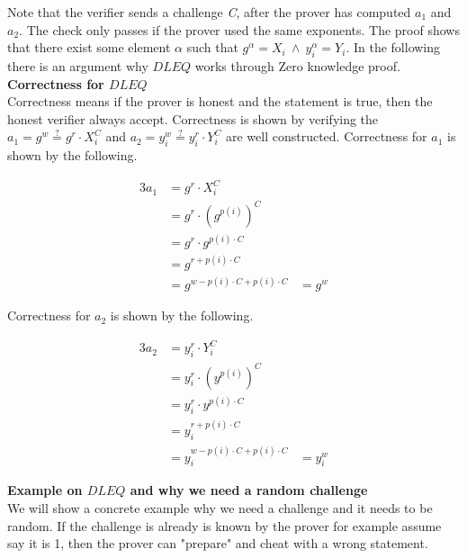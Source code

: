 \noindent
Note that the verifier sends a challenge \textit{C}, after the prover has computed \begin{math}a_1\end{math} and  \begin{math}a_2\end{math}. The check only passes if the prover used the same exponents. The proof shows that there exist some element \begin{math} \alpha\end{math} such that \begin{math}g^\alpha = X_i \ \land \ y_i^\alpha=Y_i \end{math}. In the following there is an argument why $DLEQ$ works through Zero knowledge proof.\\ 



\noindent
\textbf{Correctness for $DLEQ$}\\
Correctness means if the prover is honest and the statement is true, then the honest verifier always accept. Correctness is shown by verifying the $a_1=g^w \stackrel{?}{=} g^r \cdot X_i^C$ and $a_2=y_i^w \stackrel{?}{=} y_i^r \cdot Y_i^C$ are well constructed. Correctness for $a_1$ is shown by the following.



\begin{alignat*}{3}
a_1 &= g^r \cdot X_i^C \\
&= g^r \cdot (g^{p(i)})^C \\
&= g^r \cdot g^{p(i) \cdot C}\\
&=g^{r+p(i) \cdot C}      \\
&= g^{w - p(i) \cdot C + p(i) \cdot C} &= g^w
\end{alignat*}


\noindent
Correctness for $a_2$ is shown by the following.


\begin{alignat*}{3}
a_2 &= y_i^r \cdot Y_i^C\\
&= y_i^r \cdot (y^{p(i)})^C \\
&= y_i^r \cdot y^{p(i) \cdot C}\\
&=y_i^{r+p(i) \cdot C}      \\
&= y_i^{w - p(i) \cdot C + p(i) \cdot C} &= y_i^w
\end{alignat*}



\noindent
\textbf{Example on $DLEQ$ and why we need a random challenge}\\
We will show a concrete example why we need a challenge and it needs to be random. If the challenge is already is known by the prover for example  assume say it is 1, then the prover can "prepare" and cheat with a wrong statement. 


